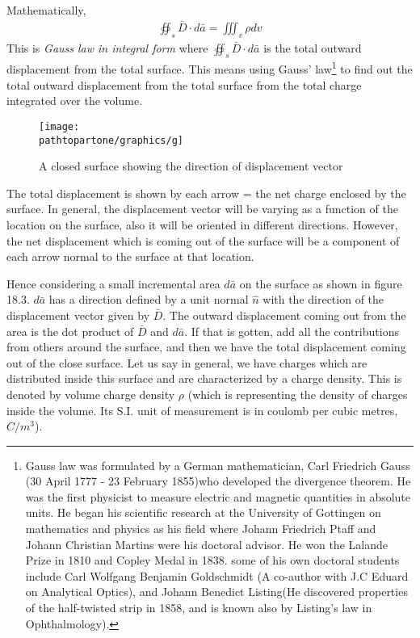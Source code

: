 Mathematically, 
\begin{align}
\boxed{\oiint_s\bar{D}\cdot{d\bar{a}} = \iiint_v\rho dv}
\end{align}
This is \emph{Gauss law in integral form} where $\oiint_s\bar{D}\cdot d\bar{a}$ is the total outward displacement from the total surface. This means using Gauss' law\footnote{
Gauss law was formulated by a German mathematician, Carl Friedrich Gauss (30 April 1777 - 23 February 1855)who developed the divergence theorem. He was the first physicist to measure electric and magnetic quantities in absolute units. He began his scientific research at the University of Gottingen on mathematics and physics as his field where Johann Friedrich Ptaff and Johann Christian Martins were his doctoral advisor. He won the Lalande Prize in 1810 and Copley Medal in 1838. some of his own doctoral students include Carl Wolfgang Benjamin Goldschmidt (A co-author with J.C Eduard on Analytical Optics), and Johann Benedict Listing(He discovered properties of the half-twisted strip in 1858, and is known also by Listing's law in Ophthalmology).
} to find out the total outward displacement from the total surface from the total charge integrated over the volume.
\begin{figure}[h]
\centering
\texttt{[image: \\pathtopartone/graphics/g]}
\caption{A closed surface showing the direction of displacement vector}
\label{fig:g}
\end{figure}

The total displacement is shown by each arrow = the net charge enclosed by the surface. In general, the displacement vector will be varying as a function of the location on the surface, also it will be oriented in different directions. However, the net displacement which is coming out of the surface will be a component of each arrow normal to the surface at that location.

Hence considering a small incremental area $ d\bar{a} $ on the surface as shown in figure 18.3. $ d\bar{a} $ has a direction defined by a unit normal $ \hat{n} $ with the direction of the displacement vector given by $ \bar{D} $. The outward displacement coming out from the area is the dot product of $ \bar{D} $ and $ d\bar{a} $. If that is gotten, add all the contributions from others around the surface, and then we have the total displacement coming out of the close surface. Let us say in general, we have charges which are distributed inside this surface and are characterized by a charge density. This is denoted by volume charge density $ \rho $ (which is representing the density of charges inside the volume. Its S.I. unit of measurement is in coulomb per cubic metres, $ C/m^{3} $).


